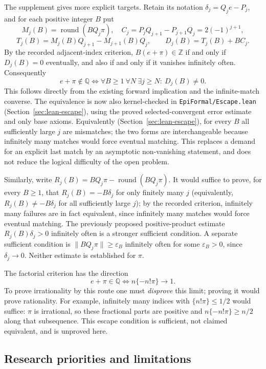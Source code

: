 \documentclass[11pt]{amsart}
\theoremstyle{definition}
\theoremstyle{remark}
\numberwithin{equation}{section}
\newcommand{\Q}{\mathbb{Q}}
\newcommand{\Z}{\mathbb{Z}}
\begin{document}
The supplement gives more explicit targets. Retain its notation $\delta_j=Q_je-P_j$, and for each positive integer $B$ put
\[
M_j(B)=\operatorname{round}(BQ_j\pi),\quad
C_j=P_jQ_{j+1}-P_{j+1}Q_j=2(-1)^{j+1},
\]
\[
T_j(B)=M_j(B)Q_{j+1}-M_{j+1}(B)Q_j,\qquad
D_j(B)=T_j(B)+BC_j.
\]
By the recorded adjacent-index criterion, $B(e+\pi)\in\Z$ if and only if $D_j(B)=0$ eventually, and also if and only if it vanishes infinitely often. Consequently
\[
e+\pi\notin\Q
\iff \forall B\ge1\ \forall N\ \exists j\ge N:\ D_j(B)\ne0.
\]
This follows directly from the existing forward implication and the infinite-match converse. The equivalence is now also kernel-checked in \texttt{EpiFormal/\allowbreak{}Escape.lean} (Section~\ref{sec:lean-escape}), using the proved selected-convergent error estimate and only base axioms. Equivalently (Section~\ref{sec:lean-escape}), for every $B$ all sufficiently large $j$ are mismatches; the two forms are interchangeable because infinitely many matches would force eventual matching. This replaces a demand for an explicit last match by an asymptotic non-vanishing statement, and does not reduce the logical difficulty of the open problem.

Similarly, write $R_j(B)=BQ_j\pi-\operatorname{round}(BQ_j\pi)$. It would suffice to prove, for every $B\ge1$, that $R_j(B)=-B\delta_j$ for only finitely many $j$ (equivalently, $R_j(B)\ne-B\delta_j$ for all sufficiently large $j$); by the recorded criterion, infinitely many failures are in fact equivalent, since infinitely many matches would force eventual matching. The previously proposed positive-product estimate $R_j(B)\delta_j>0$ infinitely often is a stronger sufficient condition. A separate sufficient condition is $\|BQ_j\pi\|\ge\varepsilon_B$ infinitely often for some $\varepsilon_B>0$, since $\delta_j\to0$. Neither estimate is established for $\pi$.

The factorial criterion has the direction
\[
e+\pi\in\Q\iff n\{-n!\pi\}\longrightarrow1.
\]
To prove irrationality by this route one must \emph{disprove} this limit; proving it would prove rationality. For example, infinitely many indices with $\{n!\pi\}\le1/2$ would suffice: $\pi$ is irrational, so these fractional parts are positive and $n\{-n!\pi\}\ge n/2$ along that subsequence. This escape condition is sufficient, not claimed equivalent, and is unproved here.

\subsection{Research priorities and limitations}
\end{document}
